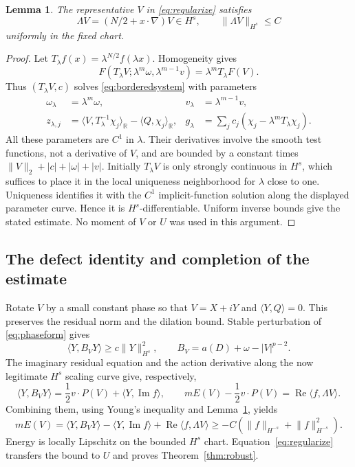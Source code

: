 \documentclass[11pt]{article}
\newtheorem{lemma}[theorem]{Lemma}
\theoremstyle{definition}
\theoremstyle{remark}
\DeclareMathOperator{\Rea}{Re}
\DeclareMathOperator{\Ima}{Im}
\newcommand{\R}{\mathbb R}
\newcommand{\ip}[2]{\langle #1,#2\rangle}
\newcommand{\norm}[1]{\lVert #1\rVert}
\begin{document}
\begin{lemma}\label{lem:dilation}
The representative $V$ in \eqref{eq:regularize} satisfies
\[
 \Lambda V=(N/2+x\cdot\nabla)V\in H^s,
 \qquad \norm{\Lambda V}_{H^s}\le C
\]
uniformly in the fixed chart.
\end{lemma}
\begin{proof}
Let $T_\lambda f(x)=\lambda^{N/2}f(\lambda x)$. Homogeneity gives
\[
 F(T_\lambda V;\lambda^m\omega,\lambda^{m-1}v)
 =\lambda^mT_\lambda F(V).
\]
Thus $(T_\lambda V,c)$ solves \eqref{eq:borderedsystem} with parameters
\begin{align*}
 \omega_\lambda&=\lambda^m\omega,&v_\lambda&=\lambda^{m-1}v,\\
 z_{\lambda,j}&=\ip V{T_\lambda^{-1}\chi_j}_{\R}
                           -\ip Q{\chi_j}_{\R},&
 g_\lambda&=\sum_jc_j(\chi_j-\lambda^mT_\lambda\chi_j).
\end{align*}
All these parameters are $C^1$ in $\lambda$. Their derivatives involve the smooth test functions, not a derivative of $V$, and are bounded by a constant times $\norm V_2+|c|+|\omega|+|v|$. Initially $T_\lambda V$ is only strongly continuous in $H^s$, which suffices to place it in the local uniqueness neighborhood for $\lambda$ close to one. Uniqueness identifies it with the $C^1$ implicit-function solution along the displayed parameter curve. Hence it is $H^s$-differentiable. Uniform inverse bounds give the stated estimate. No moment of $V$ or $U$ was used in this argument.
\end{proof}

\subsection{The defect identity and completion of the estimate}

Rotate $V$ by a small constant phase so that $V=X+iY$ and $\ip YQ=0$. This preserves the residual norm and the dilation bound. Stable perturbation of \eqref{eq:phaseform} gives
\[
 \ip Y{B_VY}\ge c\norm Y_{H^s}^2,
 \qquad B_V=a(D)+\omega-|V|^{p-2}.
\]
The imaginary residual equation and the action derivative along the now legitimate $H^s$ scaling curve give, respectively,
\begin{equation}\label{eq:twoidentities}
 \ip Y{B_VY}=\frac12v\cdot P(V)+\ip Y{\Ima f},
 \qquad mE(V)-\frac12v\cdot P(V)=\Rea\ip f{\Lambda V}.
\end{equation}
Combining them, using Young's inequality and Lemma~\ref{lem:dilation}, yields
\[
 mE(V)=\ip Y{B_VY}-\ip Y{\Ima f}+\Rea\ip f{\Lambda V}
 \ge-C(\norm f_{H^{-s}}+\norm f_{H^{-s}}^2).
\]
Energy is locally Lipschitz on the bounded $H^s$ chart. Equation~\eqref{eq:regularize} transfers the bound to $U$ and proves Theorem~\ref{thm:robust}.
\end{document}
